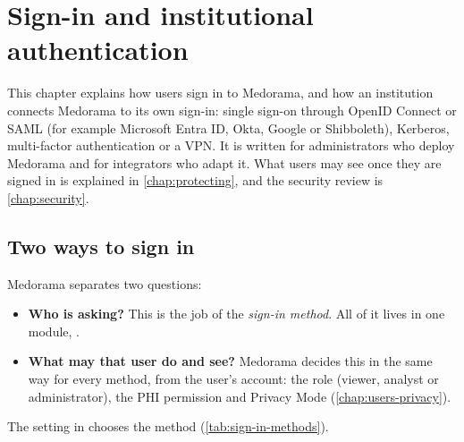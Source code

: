 \chapter{Sign-in and institutional authentication}
\label{chap:sign-in}

This chapter explains how users sign in to Medorama, and how an institution connects Medorama to
its own sign-in: single sign-on through OpenID Connect or SAML (for example Microsoft Entra ID,
Okta, Google or Shibboleth), Kerberos, multi-factor authentication or a VPN. It is written for
administrators who deploy Medorama and for integrators who adapt it. What users may see once
they are signed in is explained in \cref{chap:protecting}, and the security review is
\cref{chap:security}.

\section{Two ways to sign in}
\label{sec:sign-in-methods}

Medorama separates two questions:
\begin{itemize}
\item \textbf{Who is asking?} This is the job of the \emph{sign-in method}. All of it lives in
  one module, .
\item \textbf{What may that user do and see?} Medorama decides this in the same way for every
  method, from the user's account: the role (viewer, analyst or administrator), the PHI
  permission and Privacy Mode (\cref{chap:users-privacy}).
\end{itemize}


The setting  in  chooses the method
(\cref{tab:sign-in-methods}).

